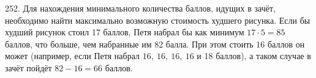252. Для нахождения минимального количества баллов, идущих в зачёт, необходимо найти максимально возможную стоимость худшего рисунка. Если бы худший рисунок стоил 17 баллов, Петя набрал бы как минимум $17\cdot5=85$ баллов, что больше, чем набранные им 82 балла. При этом стоить 16 баллов он может (например, если Петя набрал $16,\ 16,\ 16,\ 16$ и 18 баллов), а таком случае в зачёт пойдёт $82-16=66$ баллов.\\
